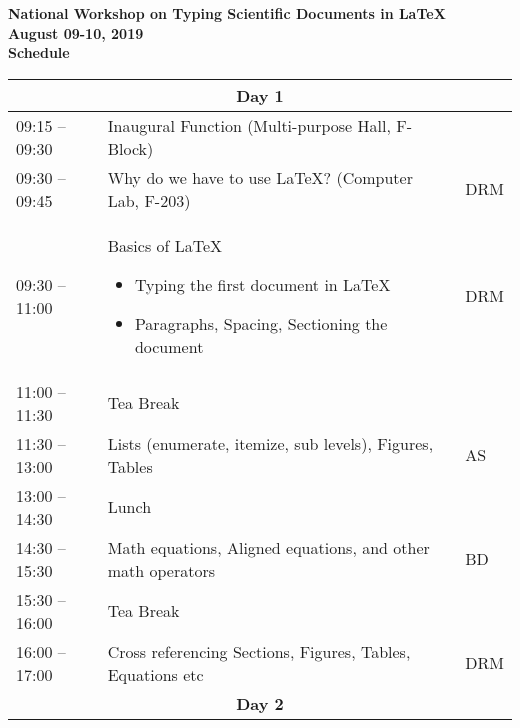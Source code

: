 \documentclass[a4paper,12pt]{article} %
\begin{document}
	\vspace*{-2cm}
\centering
	{	\Large \bfseries
 National Workshop on Typing Scientific Documents in \LaTeX \\
 August 09-10, 2019  \\ 
 Schedule}
		
		\renewcommand{\arraystretch}{1.7}
		\begin{longtable}{|p{.2\linewidth}|p{.7\linewidth}| p{.1\linewidth}|}
			\hline 
			\multicolumn{3}{|c|}{\textbf{\Large Day 1} }                                                          \\ \hline
			09:15 – 09:30 & Inaugural Function  (Multi-purpose Hall, F-Block)                                                                                             & \\ \hline
			09:30 – 09:45 & Why do we have to use \LaTeX?                              (Computer Lab, F-203)                                                                    & DRM \\ \hline
			09:30 – 11:00 & Basics of \LaTeX
			\begin{itemize}
				\item Typing the first document in \LaTeX  
				\item Paragraphs, Spacing, Sectioning the document     
			\end{itemize}                                 & DRM \\ \hline
			11:00 – 11:30 & Tea Break                                                                                                         &  \\ \hline
			11:30 – 13:00 & Lists (enumerate, itemize, sub levels), Figures, Tables    & AS \\ \hline
			13:00 – 14:30 & Lunch                                                                                                             & \\ \hline
			14:30 – 15:30 & Math equations, Aligned equations, and other math operators                                                       & BD 		\\ \hline
			15:30 – 16:00 & Tea Break                                                                                                         & \\ \hline
			16:00 – 17:00 & Cross referencing Sections, Figures, Tables, Equations etc                                                        & DRM \\ \hline
			\multicolumn{3}{|c|}{\textbf{\Large Day 2} }                                                                                                                   \\ \hline

\end{longtable}
\end{document}
